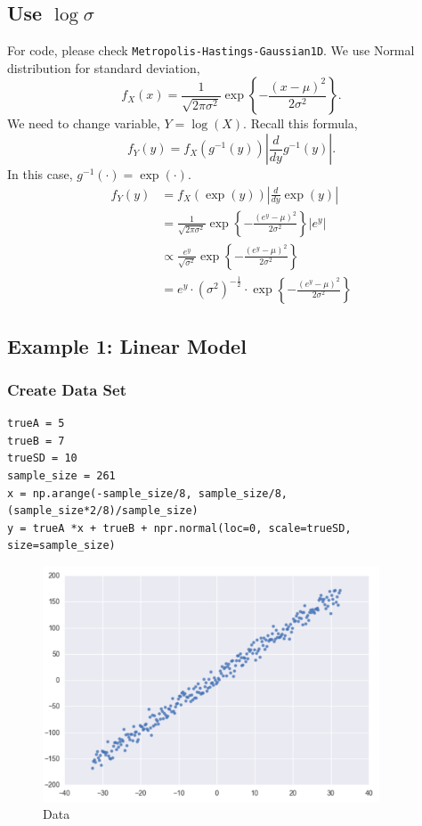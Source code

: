 \documentclass[a4paper,10.5pt,uplatex]{jsarticle}  %
\begin{document}
\subsection{Use $\log \sigma$}
For code, please check \texttt{Metropolis-Hastings-Gaussian1D}. We use Normal distribution for standard deviation, 
\begin{equation}
  f_{X} (x) = \frac{1}{\sqrt{2 \pi \sigma^2}} \exp \left\{ - \frac{(x-\mu)^2}{2 \sigma^2} \right\}.
\end{equation}
We need to change variable, $Y = \log(X)$. Recall this formula,
\begin{equation}
  f_{Y}(y) = f_{X} (g^{-1}(y)) \left| \frac{d}{dy} g^{-1}(y) \right|.
\end{equation}
In this case, $g^{-1}(\cdot) = \exp(\cdot)$.
\begin{align}
  f_{Y}(y) &= f_{X}(\exp (y)) \left| \frac{d}{dy} \exp (y) \right| \\[10pt]
           &= \frac{1}{\sqrt{2\pi \sigma^2}} \exp \left\{ - \frac{(e^y - \mu)^2}{2 \sigma^2} \right\} \left| e^y \right| \\[10pt]
           &\propto \frac{e^y}{\sqrt{\sigma^2}} \exp \left\{ - \frac{(e^y - \mu)^2}{2 \sigma^2} \right\} \\[10pt]
           &= e^y \cdot (\sigma^2)^{- \frac{1}{2}} \cdot \exp \left\{ - \frac{(e^y - \mu)^2}{2 \sigma^2} \right\}
\end{align}

\subsection{Example 1: Linear Model}
\subsubsection{Create Data Set}
\begin{lstlisting}
trueA = 5
trueB = 7
trueSD = 10
sample_size = 261
x = np.arange(-sample_size/8, sample_size/8, (sample_size*2/8)/sample_size)
y = trueA *x + trueB + npr.normal(loc=0, scale=trueSD, size=sample_size)
\end{lstlisting}
\begin{figure}[H]
\centering
\includegraphics[width=10.0cm]{mh-data.pdf}
\caption{Data}
\end{figure}
\end{document}
